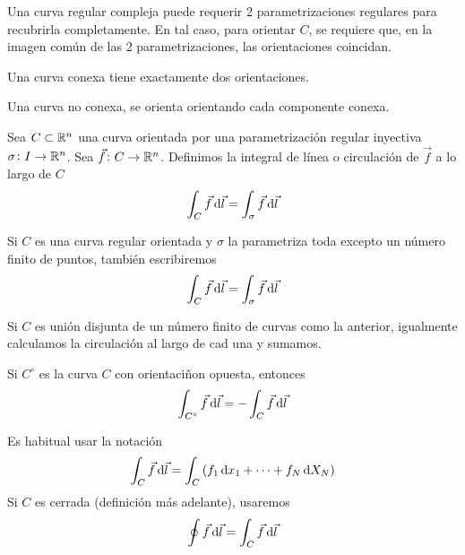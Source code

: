 \begin{obs}
    Una curva regular compleja puede requerir 2 parametrizaciones regulares para recubrirla completamente. En tal caso, para orientar $C$, se
    requiere que, en la imagen común de las 2 parametrizaciones, las orientaciones coincidan.
\end{obs}
\begin{example*}
    Una curva conexa tiene exactamente dos orientaciones.
\end{example*}
\begin{example*}
    Una curva no conexa, se orienta orientando cada componente conexa.
\end{example*}

\begin{defi}
    Sea $C \subset \mathbb{R}^n$ una curva orientada por una parametrización regular inyectiva $\sigma \colon I \to \mathbb{R}^n$. Sea $\vec{f} \colon C \to \mathbb{R}^n$.
    Definimos la integral de línea o circulación de $\vec{f}$ a lo largo de $C$
    \[
        \int_C \vec{f} \dif \vec{l} = \int_\sigma \vec{f} \dif \vec{l}
    \]
\end{defi}
\begin{obs*}
    Si $C$ es una curva regular orientada y $\sigma$ la parametriza toda excepto un número finito de puntos, tambi\'en escribiremos
    \[
        \int_C \vec{f} \dif \vec{l} = \int_\sigma \vec{f} \dif \vec{l}
    \]
\end{obs*}
\begin{obs*}
    Si $C$ es unión disjunta de un número finito de curvas como la anterior, igualmente calculamos la circulación al largo de cad una y sumamos.
\end{obs*}

\begin{obs}
    Si $C^\circ$ es la curva $C$ con orientaciñon opuesta, entonces
    \[
        \int_{C^\circ} \vec{f} \dif \vec{l} = - \int_C \vec{f} \dif \vec{l}
    \]
\end{obs}

\begin{obs}
    Es habitual usar la notación
    \[
        \int_C \vec{f} \dif \vec{l} =  \int_C \left( f_1 \dif x_1 + \cdots + f_N \dif X_N \right)
    \]
    Si $C$ es cerrada (definición más adelante), usaremos
    \[
        \oint \vec{f} \dif \vec{l} = \int_C \vec{f} \dif \vec{l}
    \]
\end{obs}

